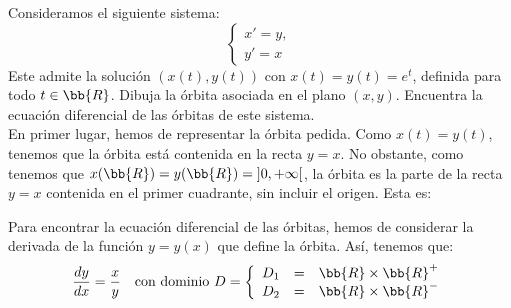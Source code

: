\documentclass[12pt]{article}
\begin{document}
    \begin{ejercicio}
        Consideramos el siguiente sistema:
        \begin{equation*}
            \begin{cases}
                x' = y,\\
                y' = x
            \end{cases}
        \end{equation*}
        Este admite la solución $(x(t), y(t))$ con $x(t) = y(t) = e^t$, definida para todo $t \in \bb{R}$. Dibuja la órbita asociada en el plano $(x, y)$. Encuentra la ecuación diferencial de las órbitas de este sistema.\\

        En primer lugar, hemos de representar la órbita pedida. Como $x(t) = y(t)$, tenemos que la órbita está contenida en la recta $y = x$.
        No obstante, como tenemos que $x(\bb{R})=y(\bb{R}) = \left]0, +\infty\right[$, la órbita es la parte de la recta $y = x$ contenida en el primer cuadrante, sin incluir el origen. Esta es:
        \begin{figure}[H]
            \centering
        \end{figure}

        Para encontrar la ecuación diferencial de las órbitas, hemos de considerar la derivada de la función $y = y(x)$ que define la órbita. Así, tenemos que:
        \begin{equation*}
            \frac{dy}{dx} = \frac{x}{y} \quad \text{con dominio } D=\left\{\begin{array}{rcl}
                D_1 &=& \bb{R}\times \bb{R}^+\\
                D_2 &=& \bb{R}\times \bb{R}^-
            \end{array} \right.
        \end{equation*}
        
    \end{ejercicio}
\end{document}
